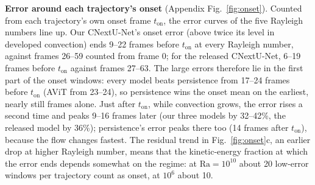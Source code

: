 \documentclass[11pt]{article}
\begin{document}
\textbf{Error around each trajectory's onset} (Appendix Fig.~\ref{fig:onset}). Counted from each trajectory's own onset frame
$t_{\mathrm{on}}$, the error curves of the five Rayleigh numbers line up. Our CNextU-Net's onset error (above twice
its level in developed convection) ends 9--22 frames before $t_{\mathrm{on}}$ at every Rayleigh number, against frames
26--59 counted from frame 0; for the released CNextU-Net, 6--19 frames before $t_{\mathrm{on}}$ against frames 27--63.
The large errors therefore lie in the first part of the onset windows: every model beats persistence from 17--24
frames before $t_{\mathrm{on}}$ (AViT from 23--24), so persistence wins the onset mean on the earliest, nearly still
frames alone. Just after $t_{\mathrm{on}}$, while convection grows, the error rises a second time and peaks 9--16
frames later (our three models by 32--42\%, the released model by 36\%); persistence's error peaks there too
(14 frames after $t_{\mathrm{on}}$), because the flow changes fastest. The residual trend in Fig.~\ref{fig:onset}c,
an earlier drop at higher Rayleigh number, means that the kinetic-energy fraction at which the error ends depends
somewhat on the regime: at $\mathrm{Ra}=10^{10}$ about 20 low-error windows per trajectory count as onset, at $10^6$
about 10.
\end{document}

